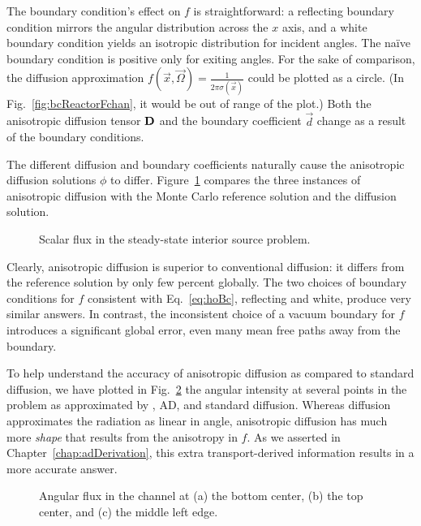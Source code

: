 The boundary condition's effect on $f$ is straightforward: a reflecting boundary
condition mirrors the angular distribution across the $x$ axis, and a white
boundary condition yields an isotropic distribution for incident angles. The
na\"ive boundary condition is positive only for exiting angles. For the sake of
comparison, the diffusion approximation $f(\vec{x},\vec{\Omega}) =
\frac{1}{2\pi \sigma(\vec{x})}$ could be plotted as a circle. (In
Fig.~\ref{fig:bcReactorFchan}, it would be out of range of the plot.) Both the
anisotropic diffusion tensor $\mathbf{D}$ and the boundary coefficient
$\vec{d}$ change as a result of the boundary conditions.

The different diffusion and boundary coefficients naturally cause the
anisotropic diffusion solutions $\phi$ to differ. Figure~\ref{fig:bcReactorFlux}
compares the three instances of anisotropic diffusion with the Monte Carlo
reference solution and the diffusion solution.

\begin{figure}[htb]
  \centering
  \hspace{-.25in}%
  
  \caption{Scalar flux in the steady-state interior source problem.}
  \label{fig:bcReactorFlux}
\end{figure}

Clearly, anisotropic diffusion is superior to conventional diffusion: it differs
from the reference solution by only few percent globally. The two choices of
boundary conditions for $f$ consistent with Eq.~\eqref{eq:hoBc}, reflecting and
white, produce very similar answers. In contrast, the inconsistent choice of a
vacuum boundary for $f$ introduces a significant global error, even many mean
free paths away from the boundary.

To help understand the accuracy of anisotropic diffusion as compared to standard
diffusion, we have plotted in Fig.~\ref{fig:bcReactorAngular} the angular
intensity at several points in the problem as approximated by \SN, AD, and
standard diffusion. Whereas diffusion approximates the radiation as linear in
angle, anisotropic diffusion has much more \emph{shape} that results from the
anisotropy in $f$. As we asserted in Chapter~\ref{chap:adDerivation}, this extra
transport-derived information results in a more accurate answer.

\begin{figure}[htb]
  \centering\small

  \caption{Angular flux in the channel at (a) the bottom center, (b) the top
  center, and (c) the middle left edge.}
  \label{fig:bcReactorAngular}
\end{figure}

